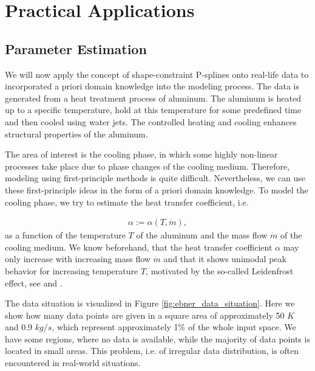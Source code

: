 \chapter{Practical Applications} \label{cha:practical-appl}

\section{Parameter Estimation} \label{sec:real-world-application}

We will now apply the concept of shape-constraint P-splines onto real-life data to incorporated a priori domain knowledge into the modeling process. The data is generated from a heat treatment process of aluminum. The aluminum is heated up to a specific temperature, hold at this temperature for some predefined time and then cooled using water jets. The controlled heating and cooling enhances structural properties of the aluminum.

The area of interest is the cooling phase, in which some highly non-linear processes take place due to phase changes of the cooling medium. Therefore, modeling using first-principle methods is quite difficult. Nevertheless, we can use these first-principle ideas in the form of a priori domain knowledge. To model the cooling phase, we try to estimate the heat transfer coefficient, i.e.

\begin{align}
	\alpha := \alpha(T, \dot m),
\end{align}
%
as a function of the temperature $T$ of the aluminum and the mass flow $\dot m$ of the cooling medium. We know beforehand, that the heat transfer coefficient $\alpha$ may only increase with increasing mass flow $\dot m$ and that it shows unimodal peak behavior for increasing temperature $T$, motivated by the so-called Leidenfrost effect, see \cite{mayinger2013stromung} and \cite{baehr2006heatandmasstransfer}.

The data situation is visualized in Figure \ref{fig:ebner_data_situation}. Here we show how many data points are given in a square area of approximately 50 $\si{K}$ and 0.9 $\si{kg}/\si{s}$, which represent approximately 1\% of the whole input space. We have some regions, where no data is available, while the majority of data points is located in small areas. This problem, i.e. of irregular data distribution, is often encountered in real-world situations. 

